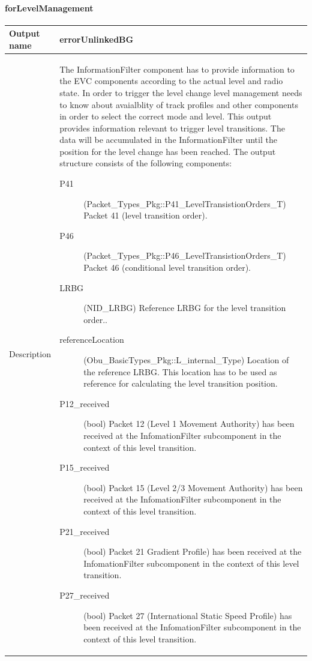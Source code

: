 \paragraph{forLevelManagement}

\begin{longtable}{p{}p{}}
\toprule
Output name				& errorUnlinkedBG \\
\midrule
Description				& The InformationFilter component has to provide information to the EVC components according to the actual level and radio state. In order to trigger the level change level management needs to know about avaialblity of track profiles and other components in order to select the correct mode and level. This output provides information relevant to trigger level transitions. The data will be accumulated in the InformationFilter until the position for the level change has been reached. The output structure consists of the following components:
\begin{description}
\item[P41](Packet\_Types\_Pkg::P41\_LevelTransistionOrders\_T) Packet 41 (level transition order). 
\item[P46](Packet\_Types\_Pkg::P46\_LevelTransistionOrders\_T) Packet 46 (conditional level transition order). 
\item[LRBG](NID\_LRBG) Reference LRBG for the level transition order..
\item[referenceLocation](Obu\_BasicTypes\_Pkg::L\_internal\_Type) Location of the reference LRBG. This location has to be used as reference for calculating the level transition position. 
\item[P12\_received](bool) Packet 12 (Level 1 Movement Authority) has been received at the InfomationFilter subcomponent in the context of this level transition. 
\item[P15\_received](bool) Packet 15 (Level 2/3 Movement Authority) has been received at the InfomationFilter subcomponent in the context of this level transition. 
\item[P21\_received](bool) Packet 21 Gradient Profile) has been received at the InfomationFilter subcomponent in the context of this level transition. 
\item[P27\_received](bool) Packet 27 (International Static Speed Profile) has been received at the InfomationFilter subcomponent in the context of this level transition. 
\end{description}


\end{longtable}
